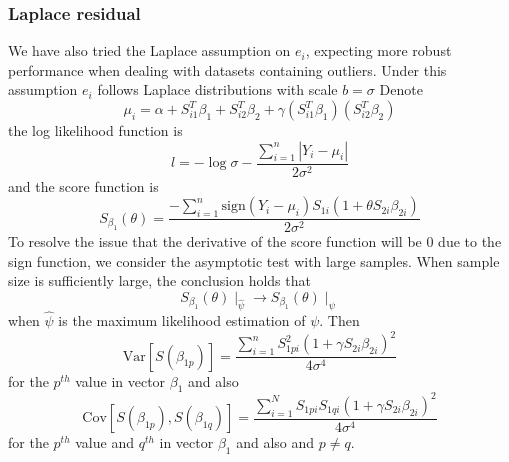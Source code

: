 \documentclass[12pt]{article}
\begin{document}
\subsubsection{Laplace residual}
We have also tried the Laplace assumption on $e_i$, expecting more robust performance when dealing with datasets containing outliers. Under this assumption $e_i$ follows Laplace distributions with scale $b = \sigma$
Denote 
$$
\mu_i=\alpha + S_{i1}^T\beta_1 + S_{i2}^T\beta_2 + \gamma (S_{i1}^T\beta_1) (S_{i2}^T\beta_2)
$$
the log likelihood function is
\begin{displaymath}
l=-\log \sigma -\dfrac {\sum ^{n}_{i=1}\left| Y_{i}-\mu _{i}\right| }{2\sigma ^{2}}
\end{displaymath}
and the score function is
\begin{displaymath}
S_{\beta_1}(\theta) = \dfrac {-\sum ^{n}_{i=1}\text{sign}\left( Y_{i}-\mu_{i} \right) S_{1i}\left( 1+\theta S_{2i}\beta _{2i}\right) }{2\sigma ^{2}}
\end{displaymath}
To resolve the issue that the derivative of the score function will be 0 due to the sign function, we consider the asymptotic test with large samples. When sample size is sufficiently large, the conclusion holds that
$$
S_{\beta_1}(\theta)\mid_{\hat{\psi}}\rightarrow S_{\beta_1}(\theta)\mid_{\psi}
$$
when $\hat{\psi}$ is the maximum likelihood estimation of $\psi$. Then
\begin{displaymath}
\text{Var}\left[ S\left( \beta _{{1p}}\right) \right] =\dfrac {\sum ^{n}_{i=1}S^{2}_{1pi}\left( 1+\gamma S_{2i}\beta _{2i}\right)^2 }{4\sigma ^{4}}
\end{displaymath}
for the $p^{th}$ value in vector $\beta_1$ and also
\begin{displaymath}
\text{Cov}[ S( \beta _{{1p}}),S( \beta_{1q})]=
\dfrac {\sum ^{N}_{i=1}S_{1pi} S_{1qi}\left( 1+\gamma S_{2i}\beta _{2i}\right)^2 }{4\sigma ^{4}}
\end{displaymath}
for the $p^{th}$ value and $q^{th}$ in vector $\beta_1$ and also and $p\neq q$.
\end{document}
